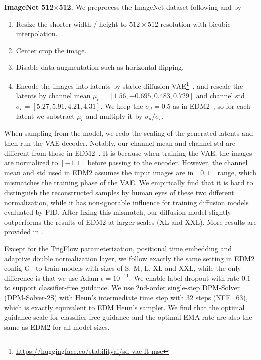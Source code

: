 \textbf{ImageNet 512$\times$512. }
We preprocess the ImageNet dataset following \citet{diffusion_beat_gan} and \citet{karras2024edm2} by
\begin{enumerate}
    \item Resize the shorter width / height to $512\times512$ resolution with bicubic interpolation.
    \item Center crop the image.
    \item Disable data augmentation such as horizontal flipping.
    \item Encode the images into latents by stable diffusion VAE\footnote{\url{https://huggingface.co/stabilityai/sd-vae-ft-mse}}~\citep{rombach2022high,diffuser}, and rescale the latents by channel mean $\mu_c=[1.56, -0.695, 0.483, 0.729]$ and channel std $\sigma_c=[5.27, 5.91, 4.21, 4.31]$. We keep the $\sigma_d=0.5$ as in EDM2~\citep{karras2024edm2}, so for each latent we substract $\mu_c$ and multiply it by $\sigma_d / \sigma_c$.
\end{enumerate}
When sampling from the model, we redo the scaling of the generated latents and then run the VAE decoder. Notably, our channel mean and channel std are different from those in EDM2~\citep{karras2024edm2}. It is because when training the VAE, the images are normalized to $[-1, 1]$ before passing to the encoder. However, the channel mean and std used in EDM2 assumes the input images are in $[0, 1]$ range, which mismatches the training phase of the VAE. We empirically find that it is hard to distinguish the reconstructed samples by human eyes of these two different normalization, while it has non-ignorable influence for training diffusion models evaluated by FID. After fixing this mismatch, our diffusion model slightly outperforms the results of EDM2 at larger scales (XL and XXL). More results are provided in .

Except for the TrigFlow parameterization, positional time embedding and adaptive double normalization layer, we follow exactly the same setting in EDM2 config G~\citep{karras2024edm2} to train models with sizes of S, M, L, XL and XXL, while the only difference is that we use Adam $\epsilon=10^{-11}$. We enable label dropout with rate $0.1$ to support classifier-free guidance. We use 2nd-order single-step DPM-Solver~\citep{lu2022dpm} (DPM-Solver-2S) with Heun's intermediate time step with 32 steps (NFE=63), which is exactly equivalent to EDM Heun's sampler. We find that the optimal guidance scale for classifier-free guidance and the optimal EMA rate are also the same as EDM2 for all model sizes.


